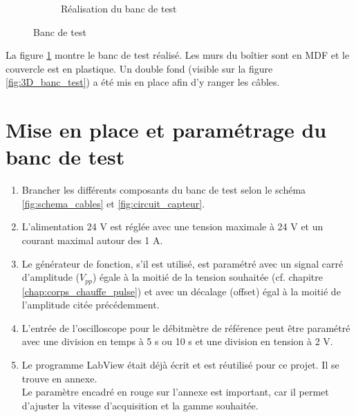 \begin{figure}[H]
\begin{subfigure}{0.45\textwidth}
        \caption{Réalisation du banc de test}
        \label{fig:banc_test_reel}
    \end{subfigure}
    \caption{Banc de test}
    \label{fig:banc_test}
\end{figure}

La figure \ref{fig:banc_test_reel} montre le banc de test réalisé. Les murs du boîtier sont en MDF et le couvercle est en plastique. Un double 
fond (visible sur la figure \ref{fig:3D_banc_test}) a été mis en place afin d'y ranger les câbles. 

\newpage
\section{Mise en place et paramétrage du banc de test}
\begin{enumerate}
    \item Brancher les différents composants du banc de test selon le schéma \ref{fig:schema_cables} et \ref{fig:circuit_capteur}.
    \item L'alimentation 24 V est réglée avec une tension maximale à 24 V et un courant maximal autour des 1 A.
    \item Le générateur de fonction, s'il est utilisé, est paramétré avec un signal carré d'amplitude ($V_{pp}$) égale à la moitié de la tension souhaitée
          (cf. chapitre \ref{chap:corps_chauffe_pulse}) et avec un décalage (offset) égal à la moitié de l'amplitude citée précédemment. 
    \item L'entrée de l'oscilloscope pour le débitmètre de référence peut être paramétré avec une division en temps à 5 s ou 10 s et une division
          en tension à 2 V. 
    \item Le programme LabView était déjà écrit et est réutilisé pour ce projet. Il se trouve en annexe. \\
          Le paramètre encadré en rouge sur l'annexe est important, car il permet d'ajuster la vitesse d'acquisition et la gamme souhaitée. 
          
          

\end{enumerate}
